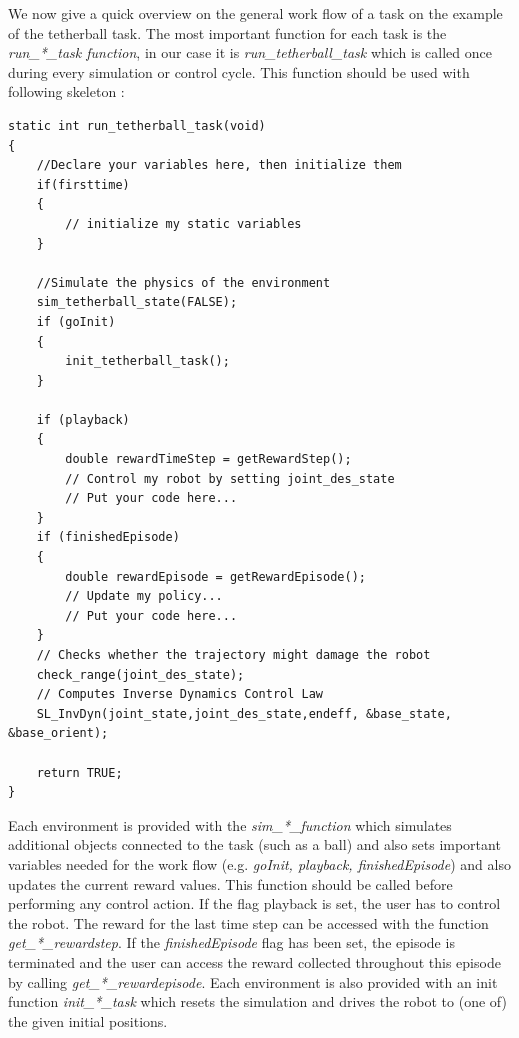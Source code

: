\documentclass[11pt, article, colorback]{article}
\begin{document}
We now give a quick overview on the general work flow of a task on the example of the 
tetherball task. The most important function for each task is the {\em run\_*\_task function}, in our case it is {\em run\_tetherball\_task} 
which is called once during every simulation or control cycle. This function should be used with following skeleton :
\begin{lstlisting}
static int run_tetherball_task(void) 
{
	//Declare your variables here, then initialize them	
	if(firsttime) 
	{
		// initialize my static variables 
	}    

	//Simulate the physics of the environment
	sim_tetherball_state(FALSE);	
	if (goInit)
	{
		init_tetherball_task();
	}   
	
	if (playback)
	{
		double rewardTimeStep = getRewardStep();
		// Control my robot by setting joint_des_state
		// Put your code here...
	}	
	if (finishedEpisode)
	{		
		double rewardEpisode = getRewardEpisode();
		// Update my policy...
		// Put your code here...
	}  
	// Checks whether the trajectory might damage the robot
	check_range(joint_des_state);   
	// Computes Inverse Dynamics Control Law
	SL_InvDyn(joint_state,joint_des_state,endeff, &base_state, &base_orient);     
	
	return TRUE;
}
\end{lstlisting}
\lstset{frame=none}
Each environment is provided with the {\em sim\_*\_function} which simulates additional objects connected to the task (such as a ball) and also sets important variables needed for the work flow (e.g. {\em goInit, playback, finishedEpisode})
and also updates the current reward values. This function should be called before performing any control action. If the flag playback is set, the user has to control the robot. The reward for the last time step can be accessed with the function
{\em get\_*\_rewardstep}. If the {\em finishedEpisode} flag has been set, the episode is terminated and the user can access the reward collected throughout this episode by calling {\em get\_*\_rewardepisode}. Each environment is also 
provided with an init function {\em init\_*\_task} which resets the simulation and drives the robot to (one of) the given initial positions. 
%
%
\end{document}
